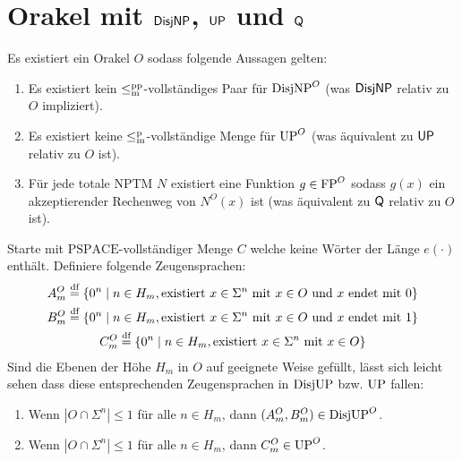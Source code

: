 \section{Orakel mit $\mathsf{DisjNP}$, $\mathsf{UP}$ und $\mathsf{Q}$}


\begin{theorem}
    Es existiert ein Orakel $O$ sodass folgende Aussagen gelten:
    \begin{enumerate}
        \item Es existiert kein $\leq_\mathrm{m}^\mathrm{pp}$-vollständiges Paar für $\mathrm{DisjNP}^O$ (was $\mathsf{DisjNP}$ relativ zu $O$ impliziert).
        \item Es existiert keine $\leq_\mathrm{m}^\mathrm{p}$-vollständige Menge für $\mathrm{UP}^O$ (was äquivalent zu $\mathsf{UP}$ relativ zu $O$ ist).
        \item Für jede totale NPTM $N$ existiert eine Funktion $g\in\mathrm{FP}^O$ sodass $g(x)$ ein akzeptierender Rechenweg von $N^O(x)$ ist (was äquivalent zu $\mathsf{Q}$ relativ zu $O$ ist).
    \end{enumerate}
\end{theorem}



Starte mit $\mathrm{PSPACE}$-vollständiger Menge $C$ welche keine Wörter der Länge $e(\cdot)$ enthält.
Definiere folgende Zeugensprachen:
\begin{gather*}
    A_m^O \stackrel{\text{df}}{=} \{ 0^n \mid n\in H_m, \text{existiert $x\in \Sigma^{n}$ mit } x\in O \text{ und $x$ endet mit $0$} \}\\
    B_m^O \stackrel{\text{df}}{=} \{ 0^n \mid n\in H_m, \text{existiert $x\in \Sigma^{n}$ mit } x\in O \text{ und $x$ endet mit $1$} \}\\
    C_m^O \stackrel{\text{df}}{=} \{ 0^n \mid n\in H_m, \text{existiert $x\in \Sigma^{n}$ mit } x\in O  \}
\end{gather*}
Sind die Ebenen der Höhe $H_m$ in $O$ auf geeignete Weise gefüllt, lässt sich leicht sehen dass diese entsprechenden Zeugensprachen in $\mathrm{DisjUP}$ bzw. $\mathrm{UP}$ fallen:
\begin{claim}
    \begin{enumerate}
        \item Wenn $|O\cap \Sigma^{n}|\leq 1$ für alle $n\in H_m$, dann $(A_m^O, B_m^O)\in\mathrm{DisjUP}^O$.
        \item Wenn $|O\cap \Sigma^n|\leq 1$ für alle $n\in H_m$, dann $C_m^O \in \mathrm{UP}^O$.
    \end{enumerate}
\end{claim}

